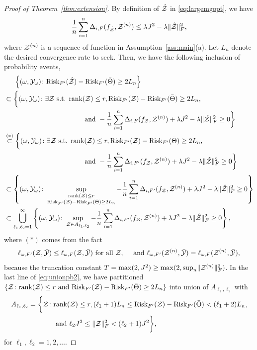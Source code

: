 \documentclass[11pt]{article}
\theoremstyle{plain}
\theoremstyle{definition}
\def\risk{\textup{Risk}}
\begin{document}
\begin{proof}[Proof of Theorem~\ref{thm:extension}]
By definition of $\hat {\mathcal{Z}}$ in \eqref{eq:largemgopt}, we have 
\[ \frac{1}{n}\sum_{i=1}^n \Delta_{i,F}(f_{\hat {\mathcal{Z}}},\mathcal{Z}^{(n)})\leq \lambda J^2-\lambda\lVert\hat{\mathcal{Z}}\rVert_F^2,\] where $\mathcal{Z}^{(n)}$ is a sequence of function in Assumption~\ref{ass:main}(a).
Let $L_n$ denote the desired convergence rate to seek.  Then, we have the following inclusion of probability events,
\begin{align}\label{eq:unionpb2}
&\hspace{.5cm}\left\{(\omega,\tY_{\omega})\colon \risk_{F'}(\hat \tZ)-\risk_{F'}(\bar\Theta)\geq 2L_n \right\}\nonumber\\
&\subset\bigg\{(\omega,\tY_{\omega})\colon\exists \tZ \text{ s.t. } \text{rank}(\tZ)\leq r,  \risk_{F'}(\tZ)-\risk_{F'}(\bar\Theta)\geq2 L_n,\nonumber
\\& \hspace{4cm}\text{ and } -\frac{1}{n}\sum_{i=1}^n\Delta_{i,F}(f_\tZ,\tZ^{(n)})+\lambda J^2-\lambda\FnormSize{}{\hat\tZ}^2\geq 0 \bigg\}\nonumber\\
&\stackrel{(*)}{\subset}\bigg\{(\omega,\tY_{\omega})\colon\exists \tZ \text{ s.t. } \text{rank}(\tZ)\leq r,  \risk_{F'}(\tZ)-\risk_{F'}(\bar\Theta)\geq2 L_n,\nonumber
\\& \hspace{4cm}\text{ and } -\frac{1}{n}\sum_{i=1}^n\Delta_{i,F'}(f_\tZ,\tZ^{(n)})+\lambda J^2-\lambda\FnormSize{}{\hat\tZ}^2\geq 0 \bigg\}\nonumber\\
&\subset \left\{(\omega,\tY_{\omega})\colon\sup_{\substack{\text{rank}(\tZ)\leq r\\  
\risk_{F'}(\tZ)-\risk_{F'}(\bar\Theta)\geq 2L_n  }}-\frac{1}{n}\sum_{i=1}^n\Delta_{i,F'}(f_\tZ,\tZ^{(n)})+\lambda J^2-\lambda\FnormSize{}{\hat\tZ}^2\geq 0\right\}\nonumber\\
&\subset \bigcup_{\ell_1,\ell_2=1}^{\infty}\left\{(\omega,\tY_\omega)\colon \sup_{\tZ\in A_{\ell_1,\ell_2}}-\frac{1}{n}\sum_{i=1}^n\Delta_{i,F'}(f_\tZ,\tZ^{(n)})+\lambda J^2-\lambda\FnormSize{}{\hat\tZ}^2\geq 0\right\},
\end{align}
where  $(*)$ comes from the fact
 \begin{align}
 \ell_{\omega,F'}(\mathcal{Z},\bar{\mathcal{Y}})\leq \ell_{\omega,F}(\mathcal{Z},\bar{\mathcal{Y}}) \text{ for all } \mathcal{Z},\quad  \text{ and }   \ell_{\omega,F'}(\mathcal{Z}^{(n)},\bar{\mathcal{Y}})= \ell_{\omega,F}(\mathcal{Z}^{(n)},\bar{\mathcal{Y}}), 
 \end{align}
 because the truncation constant $T = \max(2,J^2)\geq \max(2,\sup_n\lVert\mathcal{Z}^{(n)}\rVert_F^2)$.
In the last line of \eqref{eq:unionpb2}, we have partitioned $\{\tZ\colon \text{rank}(\tZ)\leq r \text{ and } \risk_{F'}(\tZ)-\risk_{F'}(\bar\Theta)\geq 2L_n\}$ into union of $A_{\ell_1,\ell_2}$ with 
\begin{align}
A_{\ell_1,\ell_2} = \bigg\{\tZ\colon &\text{rank}(\tZ)\leq r, (\ell_1+1) L_n\leq  \risk_{F'}(\tZ)-\risk_{F'}(\bar\Theta)<(\ell_1+2)L_n,\\
&\text{ and } \ell_2J^2\leq \FnormSize{}{\tZ}^2<(\ell_2+1)J^2\bigg\},
\end{align}
for $\ell_1,\ell_2 = 1,2,\ldots$. 



\end{proof}
\end{document}
